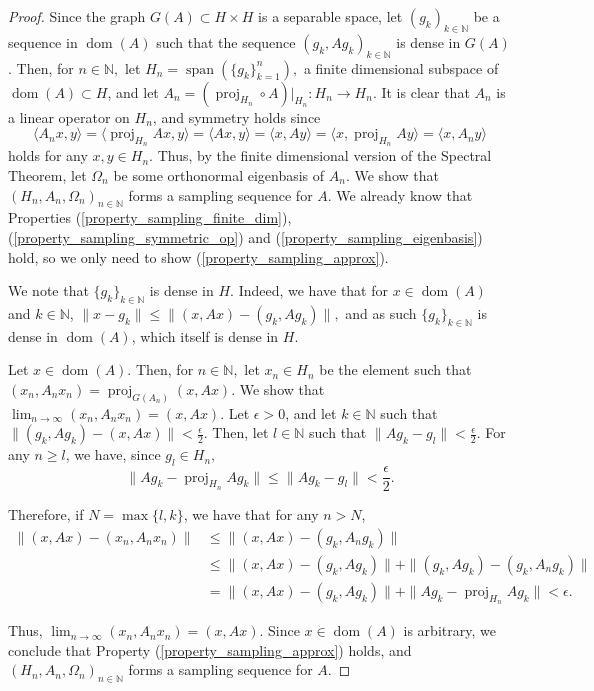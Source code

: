 \documentclass[10pt,a4paper]{amsart}
\def \Proj{\operatorname{proj}}
\def \Span{\operatorname{span}}
\def \Dom{\operatorname{dom}}
\def \LL{\langle}
\def \RR{\rangle}
\begin{document}
\begin{proof}
	Since the graph $G(A)\subset H\times H$ is a separable space, let $(g_k)_{k\in\mathbb{N}}$ be a sequence in $\Dom(A)$ such that the sequence $(g_k, Ag_k)_{k\in\mathbb{N}}$ is dense in $G(A)$. Then, for $n\in\mathbb{N},$ let $H_n=\Span(\{g_k\}_{k=1}^n),$ a finite dimensional subspace of $\Dom(A)\subset H$, and let $A_n=(\Proj_{H_n}\circ A)|_{H_n}:H_n\rightarrow H_n.$ It is clear that $A_n$ is a linear operator on $H_n$, and symmetry holds since $$\LL A_nx, y \RR=\LL \Proj_{H_n}Ax,y\RR =\LL Ax,y\RR=\LL x, Ay\RR=\LL x, \Proj_{H_n} Ay\RR=\LL x, A_ny\RR$$ holds for any $x,y\in H_n.$ Thus, by the finite dimensional version of the Spectral Theorem, let $\Omega_n$ be some orthonormal eigenbasis of $A_n$. We show that $(H_n,A_n,\Omega_n)_{n\in\mathbb{N}}$ forms a sampling sequence for $A$. We already know that Properties (\ref{property_sampling_finite_dim}), (\ref{property_sampling_symmetric_op}) and (\ref{property_sampling_eigenbasis}) hold, so we only need to show (\ref{property_sampling_approx}).
	
	We note that $\{g_k\}_{k\in\mathbb{N}}$ is dense in $H$. Indeed, we have that for $x\in\Dom(A)$ and $k\in\mathbb{N}$, $\|x-g_k\|\leq\|(x,Ax)-(g_k,Ag_k)\|,$ and as such $\{g_k\}_{k\in\mathbb{N}}$ is dense in $\Dom(A)$, which itself is dense in $H$.
	
	  Let $x\in\Dom(A).$ Then, for $n\in\mathbb{N},$ let $x_n\in H_n$ be the element such that $(x_n, A_n x_n)=\Proj_{G(A_n)}(x,Ax).$ We show that $\lim_{n\rightarrow\infty} (x_n, A_nx_n)=(x,Ax).$ Let $\epsilon>0$, and let $k\in\mathbb{N}$ such that $\|(g_k,A g_k)-(x,Ax)\|<\frac{\epsilon}{2}.$ Then, let $l\in\mathbb{N}$ such that $\|A g_k-g_l\|<\frac{\epsilon}{2}.$ For any $n\geq l$, we have, since $g_l\in H_n,$  $$\|Ag_k-\Proj_{H_n}Ag_k\|\leq\|Ag_k-g_l\|<\frac{\epsilon}{2}.$$ 
	  
	  Therefore, if $N=\max\{l,k\}$, we have that for any $n>N$, 
	  \begin{align*}
	  	\|(x,Ax)-(x_n,A_nx_n)\|&\leq \|(x,Ax)-(g_k,A_ng_k)\|\\
	  	&\leq \|(x,Ax)-(g_k,Ag_k)\|+\|(g_k,Ag_k)-(g_k,A_ng_k)\|\\
	  	&=\|(x,Ax)-(g_k,Ag_k)\|+\|Ag_k-\Proj_{H_n}Ag_k\|<\epsilon.
	  \end{align*} 
	  
	  Thus, $\lim_{n\rightarrow\infty}(x_n,A_nx_n)=(x,Ax).$ Since $x\in\Dom(A)$ is arbitrary, we conclude that Property (\ref{property_sampling_approx}) holds, and $(H_n, A_n,\Omega_n)_{n\in\mathbb{N}}$ forms a sampling sequence for $A$.
\end{proof}
\end{document}
